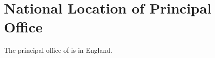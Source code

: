 \section{National Location of Principal Office}\label{sec:location}
The principal office of \shortname{} is in England.

